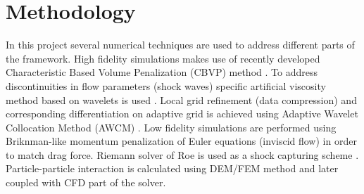 \section{Methodology}
In this project several numerical techniques are used to address different parts of the framework. High fidelity simulations makes use of recently developed Characteristic Based Volume Penalization (CBVP) method \cite{ebd_nk_ovv_cbvp_jcp}. To address discontinuities in flow parameters (shock waves) specific artificial viscosity method based on wavelets is used \cite{lib:RegVas}. Local grid refinement (data compression) and corresponding differentiation on adaptive grid is achieved using Adaptive Wavelet Collocation Method (AWCM) \cite{lib:wlt_main}. Low fidelity simulations are performed using Briknman-like momentum penalization of Euler equations (inviscid flow) in order to match drag force. Riemann solver of Roe is used as a shock capturing scheme \cite{book:Toro}. Particle-particle interaction is calculated using DEM/FEM method and later coupled with CFD part of the solver.
